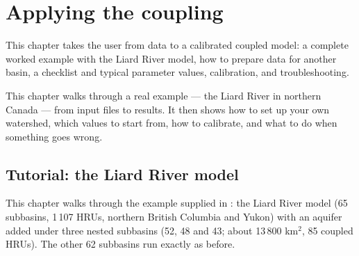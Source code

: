 \chapter{Applying the coupling}\label{ch:c7}
This chapter takes the user from data to a calibrated coupled model: a complete worked example with the Liard River model,
how to prepare data for another basin, a checklist and typical parameter values, calibration, and troubleshooting.

\begin{plain}
This chapter walks through a real example --- the Liard River in northern Canada --- from input files to results. It then
shows how to set up your own watershed, which values to start from, how to calibrate, and what to do when something goes
wrong.
\end{plain}

\section{Tutorial: the Liard River model}\label{ch:tutorial}
This chapter walks through the example supplied in : the Liard River model (65 subbasins,
1\,107 HRUs, northern British Columbia and Yukon) with an aquifer added under three nested subbasins (52, 48 and 43;
about 13\,800 km$^2$, 85 coupled HRUs). The other 62 subbasins run exactly as before.

